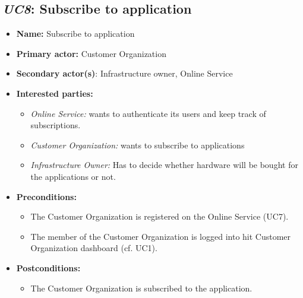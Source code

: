 \documentclass[english,peerreview]{sareport}
\begin{document}
\subsection{\emph{UC8}: Subscribe to application}
\begin{itemize}
    \item \textbf{Name:} Subscribe to application
    \item \textbf{Primary actor:} Customer Organization
    \item \textbf{Secondary actor(s)}: Infrastructure owner, Online Service
    \item \textbf{Interested parties:} 
        \begin{itemize}
            \item \textit{Online Service:} wants to authenticate its users and keep track of subscriptions.
            \item \textit{Customer Organization:} wants to subscribe to applications
            \item \textit{Infrastructure Owner:} Has to decide whether hardware will be bought for the applications or not.
        \end{itemize}

    \item \textbf{Preconditions:}
        \begin{itemize}
            \item The Customer Organization is registered on the Online Service (UC7).
            \item The member of the Customer Organization is logged into hit Customer Organization dashboard (cf. UC1).
        \end{itemize}

    \item \textbf{Postconditions:}
        \begin{itemize}
            \item The Customer Organization is subscribed to the application.

        \end{itemize}


\end{itemize}
\end{document}
